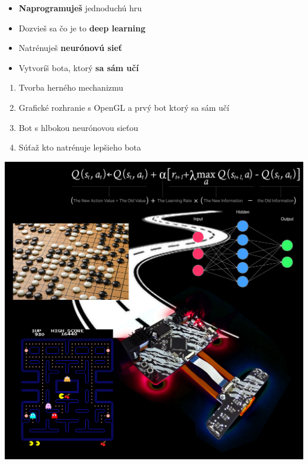 \documentclass[10pt,a5paper]{article}
\begin{document}
        \begin{minipage}{0.5\textwidth}

            \begin{itemize}
            \item {\bf Naprogramuješ} jednoduchú hru
            \item Dozvieš sa čo je to {\bf deep learning}
            \item Natrénuješ {\bf neurónovú sieť}
            \item Vytvoríš bota, ktorý {\bf sa sám učí}
            \end{itemize}

            \begin{enumerate}
            \item Tvorba herného mechanizmu
            \item Grafické rozhranie s OpenGL a prvý bot ktorý sa sám učí
            \item Bot s hlbokou neurónovou sieťou
            \item Súťaž kto natrénuje lepšieho bota
            \end{enumerate}

        \end{minipage}
        \begin{minipage}{0.5\textwidth}
             \vspace{-2ex}
              \includegraphics[scale=0.04]{../../pictures/rl_square_2.jpg}

        \end{minipage}
\end{document}
